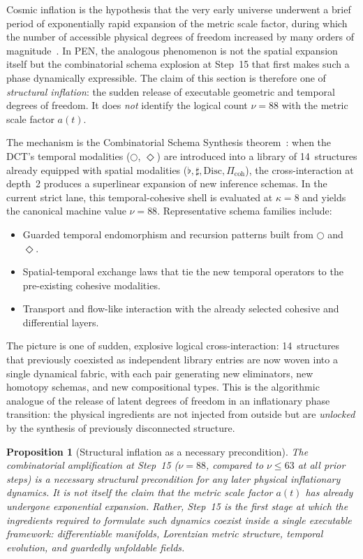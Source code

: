 \documentclass[11pt,a4paper]{article}
\theoremstyle{plain}
\newtheorem{proposition}[theorem]{Proposition}
\theoremstyle{definition}
\theoremstyle{remark}
\newcommand{\Disc}{\mathrm{Disc}}
\newcommand{\nextmod}{\bigcirc}
\newcommand{\eventually}{\Diamond}
\begin{document}
Cosmic inflation is the hypothesis that the very early universe underwent a brief period of exponentially rapid expansion of the metric scale factor, during which the number of accessible physical degrees of freedom increased by many orders of magnitude~\cite{guth,linde}.
In PEN, the analogous phenomenon is not the spatial expansion itself but the combinatorial schema explosion at Step~15 that first makes such a phase dynamically expressible.
The claim of this section is therefore one of \emph{structural inflation}: the sudden release of executable geometric and temporal degrees of freedom.
It does \emph{not} identify the logical count $\nu = 88$ with the metric scale factor $a(t)$.

The mechanism is the Combinatorial Schema Synthesis theorem~\cite{pen}: when the DCT's temporal modalities ($\nextmod$, $\eventually$) are introduced into a library of 14~structures already equipped with spatial modalities ($\flat, \sharp, \Disc, \Pi_{\mathrm{coh}}$), the cross-interaction at depth~2 produces a superlinear expansion of new inference schemas.
In the current strict lane, this temporal-cohesive shell is evaluated at $\kappa = 8$ and yields the canonical machine value $\nu = 88$.
Representative schema families include:

\begin{itemize}[nosep]
    \item Guarded temporal endomorphism and recursion patterns built from $\nextmod$ and $\eventually$.
    \item Spatial-temporal exchange laws that tie the new temporal operators to the pre-existing cohesive modalities.
    \item Transport and flow-like interaction with the already selected cohesive and differential layers.
\end{itemize}

The picture is one of sudden, explosive logical cross-interaction: 14~structures that previously coexisted as independent library entries are now woven into a single dynamical fabric, with each pair generating new eliminators, new homotopy schemas, and new compositional types.
This is the algorithmic analogue of the release of latent degrees of freedom in an inflationary phase transition: the physical ingredients are not injected from outside but are \emph{unlocked} by the synthesis of previously disconnected structure.

\begin{proposition}[Structural inflation as a necessary precondition]
\label{prop:structural-inflation}
The combinatorial amplification at Step~15 ($\nu = 88$, compared to $\nu \leq 63$ at all prior steps) is a necessary structural precondition for any later physical inflationary dynamics.
It is not itself the claim that the metric scale factor $a(t)$ has already undergone exponential expansion.
Rather, Step~15 is the first stage at which the ingredients required to formulate such dynamics coexist inside a single executable framework: differentiable manifolds, Lorentzian metric structure, temporal evolution, and guardedly unfoldable fields.
\end{proposition}
\end{document}
